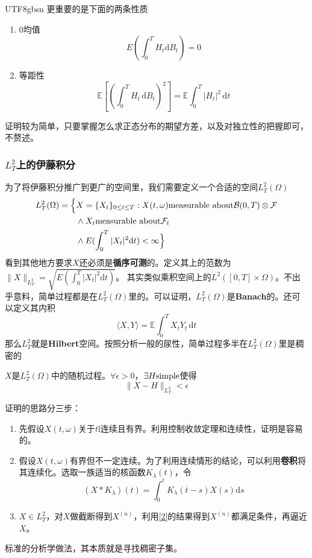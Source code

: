 \documentclass{article}
\begin{document}
\begin{CJK*}{UTF8}{gbsn}
更重要的是下面的两条性质
\begin{enumerate}
    \item 0均值 $$E\left(\int_0^TH_t\mathrm{d}B_t\right)=0 $$
    \item 等距性 \label{pro2}
    $$\mathbb{E}\!\left[\left(\int_0^T H_t\,\mathrm{d}B_t\right)^2\right]
=\mathbb{E}\!\int_0^T |H_t|^2\,\mathrm{d}t $$
\end{enumerate}
证明较为简单，只要掌握怎么求正态分布的期望方差，以及对独立性的把握即可，不赘述。
\subsubsection{$L^2_T$上的伊藤积分}
为了将伊藤积分推广到更广的空间里，我们需要定义一个合适的空间$L^2_T(\Omega)$
$$\begin{aligned}
L^2_T(\Omega)
=\Big
\{&X=\{X_t\}_{0\le t\le T}:X(t,\omega)\space\text{measurable about}\space\mathcal{B}(0,T)\otimes\mathcal{F}\\
&\land X_t\space\text{measurable about}\space\mathcal{F}_t \\
&\land E(\int_0^T|X_t|^2\mathrm{d}t)<\infty\Big\}
\end{aligned}
$$
看到其他地方要求$X$还必须是\textbf{循序可测}的。定义其上的范数为$\|X\|_{L_T^2}=\sqrt{E(\int_0^T|X_t|^2\mathrm{d}t)}$。
其实类似乘积空间上的$L^2([0,T]\times\Omega)$。不出乎意料，简单过程都是在$L^2_T(\Omega)$里的。可以证明，$L^2_T(\Omega)$是\textbf{Banach}的。还可以定义其内积
$$
\langle X,Y\rangle = \mathbb{E}\!\int_0^T X_tY_t\,\mathrm{d}t
$$
那么$L_T^2$就是\textbf{Hilbert}空间。按照分析一般的尿性，简单过程多半在$L^2_T(\Omega)$里是稠密的
\begin{theorem}
$X$是$L^2_T(\Omega)$中的随机过程。$\forall\epsilon>0$，$\exists H\space\text{simple}$使得
    $$
    \|X-H\|_{L_T^2}<\epsilon
    $$
\end{theorem}
证明的思路分三步：
\begin{enumerate}
    \item 先假设$X(t,\omega)$关于$t$l连续且有界。利用控制收敛定理和连续性，证明是容易的。
    \item 假设$X(t,\omega)$有界但不一定连续\label{2}。为了利用连续情形的结论，可以利用\textbf{卷积}将其连续化。选取一族适当的核函数$K_\lambda(t)$，令
    $$(X*K_\lambda)(t)=\int_0^tK_\lambda(t-s)X(s)\mathrm{d}s$$
    \item $X\in L_T^2$，对$X$做截断得到$X^{(n)}$，利用\ref{2}的结果得到$X^{(n)}$都满足条件，再逼近$X$。
\end{enumerate}
标准的分析学做法，其本质就是寻找稠密子集。


\end{CJK*}
\end{document}
